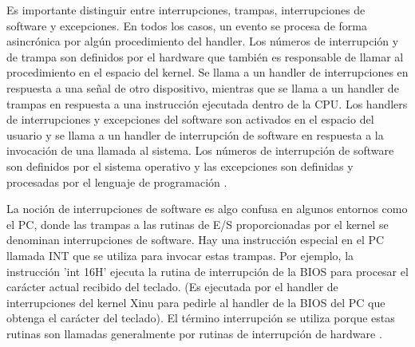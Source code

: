 \documentclass[12pt]{article}
\begin{document}
{Es importante distinguir entre interrupciones, trampas, interrupciones de software y excepciones. En todos los casos, un evento se procesa de forma asincrónica por algún procedimiento del handler. Los números de interrupción y de trampa son definidos por el hardware que también es responsable de llamar al procedimiento en el espacio del kernel. Se llama a un handler de interrupciones en respuesta a una señal de otro dispositivo, mientras que se llama a un handler de trampas en respuesta a una instrucción ejecutada dentro de la CPU. Los handlers de interrupciones y excepciones del software son activados en el espacio del usuario y se llama a un handler de interrupción de software en respuesta a la invocación de una llamada al sistema. Los números de interrupción de software son definidos por el sistema operativo y las excepciones son definidas y procesadas por el lenguaje de programación \citep{Softm}.
\newline

La noción de interrupciones de software es algo confusa en algunos entornos como el PC, donde las trampas a las rutinas de E/S proporcionadas por el kernel se denominan interrupciones de software. Hay una instrucción especial en el PC llamada INT que se utiliza para invocar estas trampas. Por ejemplo, la instrucción 'int 16H' ejecuta la rutina de interrupción de la BIOS para procesar el carácter actual recibido del teclado. (Es ejecutada por el handler de interrupciones del kernel Xinu para pedirle al handler de la BIOS del PC que obtenga el carácter del teclado). El término interrupción se utiliza porque estas rutinas son llamadas generalmente por rutinas de interrupción de hardware \citep{Softm}.


\medskip

 



}
\end{document}
